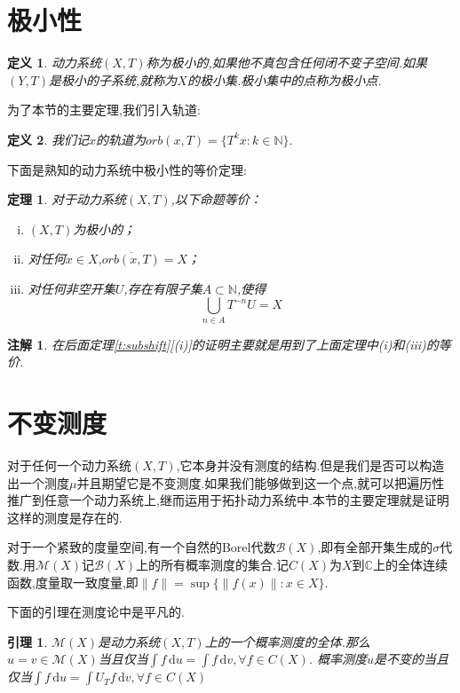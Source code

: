 \documentclass[a4paper,11pt,oneside]{book}
\newtheorem{theorem}{\textbf{\hspace{0.7cm}定理}}[section]
\newtheorem{lemma}{\textbf{\hspace{0.7cm}引理}}[section]
\newtheorem{definition}{\textbf{\hspace{0.7cm}定义}}[section]
\newtheorem{remark}{\textbf{\hspace{0.7cm}注解}}[section]
\newcommand{\B}{\mathcal{B}}
\begin{document}
\section{极小性}
\begin{definition}
动力系统$(X,T)$称为极小的,如果他不真包含任何闭不变子空间.如果$(Y,T)$是极小的子系统,就称为$X$的极小集.极小集中的点称为极小点.
\end{definition}
为了本节的主要定理,我们引入轨道:
\begin{definition}
我们记$x$的轨道为$orb(x,T)=\{T^kx:k\in\mathbb{N}\}.$
\end{definition}
下面是熟知的动力系统中极小性的等价定理:
\begin{theorem}
\label{t:minimal}
对于动力系统$(X,T)$,以下命题等价：
\begin{enumerate}[(i)]
\item $(X,T)$为极小的；
\item 对任何$x\in X$,$\overline{orb(x,T)}=X$；
\item 对任何非空开集$U$,存在有限子集$A\subset \mathbb{N}$,使得$$\bigcup_{n\in A}T^{-n}U=X$$
\end{enumerate}
\end{theorem}
\begin{remark}
在后面定理\ref{t:subshift}[(i)]的证明主要就是用到了上面定理中(i)和(iii)的等价.
\end{remark}



\section{不变测度}
对于任何一个动力系统$(X,T)$,它本身并没有测度的结构.但是我们是否可以构造出一个测度$\mu$并且期望它是不变测度.如果我们能够做到这一个点,就可以把遍历性推广到任意一个动力系统上,继而运用于拓扑动力系统中.本节的主要定理就是证明这样的测度是存在的.

对于一个紧致的度量空间,有一个自然的Borel代数$\B (X)$,即有全部开集生成的$\sigma$代数.用$\mathcal{M}(X)$记$\mathcal{B}(X)$上的所有概率测度的集合.记$C(X)$为$X$到$\mathbb{C}$上的全体连续函数,度量取一致度量,即$\|f\|=\sup\{\|f(x)\|:x\in X\}$.

下面的引理在测度论中是平凡的.
\begin{lemma}
\label{l}
$\mathcal{M}(X)$是动力系统$(X,T)$上的一个概率测度的全体.那么$u=v\in \mathcal{M}(X)$当且仅当$\int\!f \, \mathrm{d}u=\int f\, \mathrm{d}v,\forall f\in C(X)$.
概率测度$u$是不变的当且仅当$\int\!f \, \mathrm{d}u=\int\! U_Tf\, \mathrm{d}v,\forall f\in C(X)$
\end{lemma}
\end{document}
